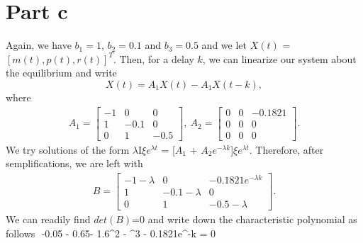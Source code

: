 \section{Part c}
Again, we have $b_{1}=1$, $b_{2}=0.1$ and $b_{3}=0.5$ and we let $X(t)$ = $[m(t),p(t),r(t)]^{T}$. Then, for a delay $k$, we can linearize our system about the equilibrium and write
$$
X(t) = A_{1}X(t) - A_{1}X(t-k),
$$
where
\begin{align*}
A_{1}  = \begin{bmatrix}
-1 & 0 & 0\\
1 & -0.1 & 0\\
0 & 1 & -0.5
\end{bmatrix}, \
A_{2}  = \begin{bmatrix}
0 & 0 & -0.1821\\
0 & 0 & 0\\
0 & 0 & 0
\end{bmatrix}.
\end{align*}
We try solutions of the form $\lambda$I$\xi$$e^{\lambda t}$ = [$A_{1}$ + $A_{2}$$e^{-\lambda k}$]$\xi$$e^{\lambda t}$. Therefore, after semplifications, we are left with
\begin{align*}
B = \begin{bmatrix}
-1 -\lambda & 0 & -0.1821e^{-\lambda k}\\
1 & -0.1 - \lambda & 0\\
0 & 1 & -0.5 - \lambda
\end{bmatrix}.
\end{align*}
We can readily find $det(B)$=0 and write down the characteristic polynomial as follows
$$
-0.05 - 0.65\lambda - 1.6\lambda^{2} - \lambda^{3} - 0.1821e^{-\lambda k} = 0
